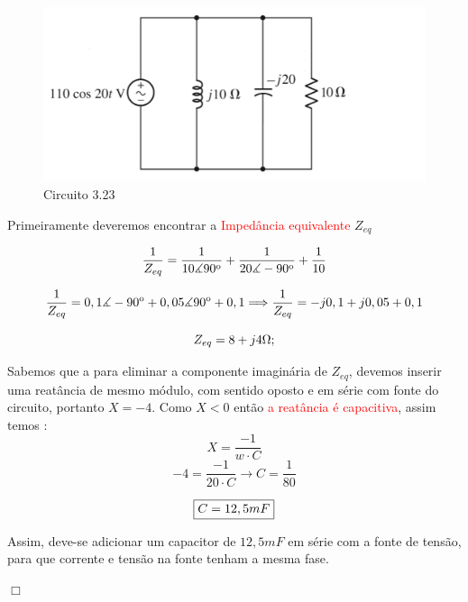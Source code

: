 \documentclass[
	12pt,				%
	oneside,			%
	a4paper,			%
	english,			%
	french,				%
	spanish,			%
	brazil				%
	]{abntex2}
\begin{document}
\begin{figure}[htb]
	\centering
	\includegraphics[scale=1]{circuito323.png}
	\caption{Circuito 3.23}
\end{figure}

Primeiramente deveremos encontrar a \textcolor{red}{Impedância equivalente} $Z_{eq}$

\begin{equation*}
    \centering
    \dfrac{1}{Z_{eq}} = \dfrac{1}{10 \measuredangle 90 \textsuperscript{o} } + \dfrac{1}{20 \measuredangle -90\textsuperscript{o}} + \dfrac{1}{10} 
\end{equation*}

\begin{equation*}
    \centering
    \dfrac{1}{Z_{eq}} = 0,1 \measuredangle -90 \textsuperscript{o}  + 0,05 \measuredangle 90\textsuperscript{o} + 0,1 \Longrightarrow \dfrac{1}{Z_{eq}} = -j0,1 + j0,05 + 0,1
\end{equation*}

\begin{equation}
    \centering
    Z_{eq} = 8 + j4 \Omega;
\end{equation}

Sabemos que a para eliminar a componente imaginária de $Z_{eq}$, devemos inserir uma reatância de mesmo módulo, com sentido oposto e em série com fonte do circuito, portanto $ X = -4 $.
Como $X < 0$ então \textcolor{red}{a reatância é capacitiva}, assim temos : 
$$ X = \dfrac{-1}{w\cdot C}$$
$$ -4 = \dfrac{-1}{20 \cdot C} \longrightarrow C = \dfrac{1}{80}$$

\begin{equation}
    \centering
    \fbox{$C = 12,5 mF$}
\end{equation}

Assim, deve-se adicionar um capacitor de $12,5 mF$ em série com a fonte de tensão, para que corrente e tensão na fonte tenham a mesma fase.

\begin{flushright}
    $\Box$
\end{flushright}
\newpage
\end{document}
